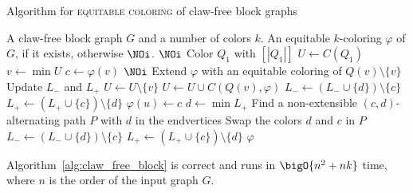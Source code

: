 \begin{algorithm}[!htb]
    \caption{Algorithm for \textsc{equitable coloring} of claw-free block graphs}
    \begin{algorithmic}[1]
        \REQUIRE A claw-free block graph $G$ and a number of colors $k$.
        \ENSURE An equitable $k$-coloring $\varphi$ of $G$, if it exists, otherwise $\NOi$.
        \smallskip
            \RETURN $\NOi$
        \ENDIF
        \STATE Color $Q_1$ with $[|Q_1|]$
        \STATE $U \gets C(Q_1)$
            \STATE $v \gets \min U$
            \STATE $c \gets \varphi(v)$
                \RETURN $\NOi$
            \ENDIF
                \STATE Extend $\varphi$ with an equitable coloring of $Q(v) \setminus \{v\}$
                \STATE Update $L_-$ and $L_+$
                \STATE $U \gets U \setminus \{v\}$
                \STATE $U \gets U \cup C(Q(v), \varphi)$
                \STATE $L_- \gets (L_-  \cup \{d\}) \setminus \{c\}$
                \STATE $L_+ \gets (L_+  \cup \{c\}) \setminus \{d\}$
                \STATE $\varphi(u) \gets c$
            \ELSE
                \STATE $d \gets \min L_+$
                \STATE Find a non-extensible $(c, d)$-alternating path $P$ with $d$ in the endvertices
                \STATE Swap the colors $d$ and $c$ in $P$
                \STATE $L_- \gets (L_-  \cup \{d\}) \setminus \{c\}$
                \STATE $L_+ \gets (L_+  \cup \{c\}) \setminus \{d\}$
            \ENDIF
        \ENDWHILE
        \RETURN $\varphi$
    \end{algorithmic}
\label{alg:claw_free_block}
\end{algorithm}

\begin{theorem}
    \label{thm:claw_free_block}
    Algorithm~\ref{alg:claw_free_block} is correct and runs in $\bigO{n^2 + nk}$ time, where $n$ is the order of the input graph $G$.
\end{theorem}

